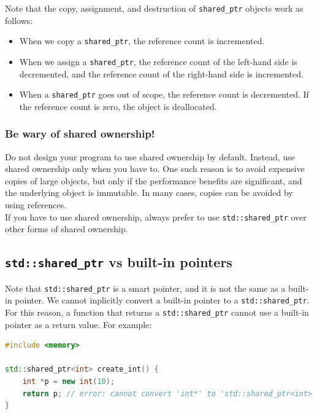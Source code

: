 Note that the copy, assignment, and destruction of \texttt{shared\_ptr} objects work
as follows:

\begin{itemize}
    \item When we copy a \texttt{shared\_ptr}, the reference count is incremented.
    \item When we assign a \texttt{shared\_ptr}, the reference count of the left-hand side
    is decremented, and the reference count of the right-hand side is incremented.
    \item When a \texttt{shared\_ptr} goes out of scope, the reference count is decremented.
    If the reference count is zero, the object is deallocated.
\end{itemize}

\subsubsection{Be wary of shared ownership!}

Do not design your program to use shared ownership by default. Instead, use shared ownership
only when you have to. One such reason is to avoid expensive copies of large objects, but only if the
performance benefits are significant, and the underlying object is immutable. In many cases,
copies can be avoided by using references.\\

If you have to use shared ownership, always prefer to use \texttt{std::shared\_ptr} over
other forms of shared ownership.

\subsection{\texttt{std::shared\_ptr} vs built-in pointers}

Note that \texttt{std::shared\_ptr} is a smart pointer, and it is not the same as a built-in pointer.
We cannot inplicitly convert a built-in pointer to a \texttt{std::shared\_ptr}. For this reason, a 
function that returns a \texttt{std::shared\_ptr} cannot use a built-in pointer as a return value.
For example:

\begin{lstlisting}[language=C++]
#include <memory>

std::shared_ptr<int> create_int() {
    int *p = new int(10);
    return p; // error: cannot convert 'int*' to 'std::shared_ptr<int>'
}
\end{lstlisting}


